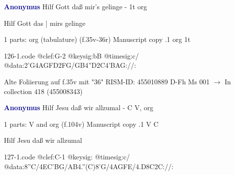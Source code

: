 \documentclass[twocolumn]{book}
\begin{document}
\newline \par \vspace{7pt} \textcolor{darkblue}{\textbf{Anonymus  }}
\newline Hilf Gott daß mir's gelinge - 1t
\newline org
\newline \begin{itshape}[f.35v, at left:] Hilf Gott das | mirs gelinge\end{itshape} 
\newline \textcolor{darkblue}{}  1 parts: org (tabulature)  (f.35v-36r)
\newline Manuscript copy
.1  org  1t  
\begin{filecontents*}{126-1.code}
@clef:G-2
@keysig:bB
@timesig:c/
@data:2'G4AGFD2FG/GB4''D2C4'BAG://:
\end{filecontents*}
\newline
%

\newline Alte Foliierung auf f.35v mit "36"
\newline RISM-ID: 455010889
\newline D-Fh  Ms 001
\newline $\rightarrow$ In collection 418 (455008343)
      
\newline \par \vspace{7pt} \textcolor{darkblue}{\textbf{Anonymus  }}
\newline Hilf Jesu daß wir allzumal - C
\newline V, org
\newline \begin{itshape}\end{itshape} 
\newline \textcolor{darkblue}{}  1 parts: V and org  (f.104v)
\newline Manuscript copy
.1  V  C
\newline \begin{footnotesize} Hilf Jesu daß wir allzumal \end{footnotesize}  
\begin{filecontents*}{127-1.code}
@clef:C-1
@keysig:
@timesig:c/
@data:8''C/4EC'BG/AB4.''(C)8'G/4AGFE/4.D8C2C://:
\end{filecontents*}
\newline
%
\end{document}
